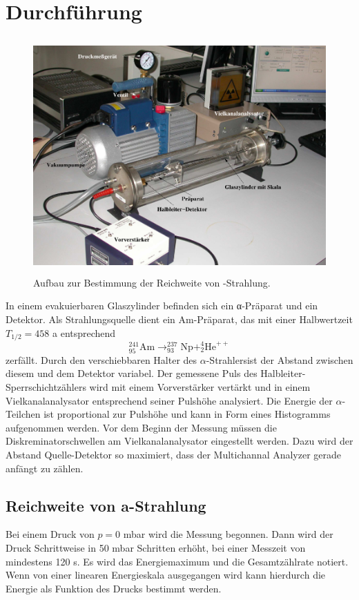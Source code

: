 \section{Durchführung}
\label{sec:Durchführung}

\begin{figure}
  \centering
  \includegraphics[height=9cm]{data/abb1.png}
  \caption{Aufbau zur Bestimmung der Reichweite von \alpha-Strahlung. \cite{sample}}
  \label{fig:abbA1}
\end{figure}
\FloatBarrier

In einem evakuierbaren Glaszylinder befinden sich ein α-Präparat und ein Detektor.
Als Strahlungsquelle dient ein Am-Präparat, das mit einer Halbwertzeit $T_{1/2} = 458$ a entsprechend
\begin{equation}
    _{95}^{241}\text{Am} \longrightarrow _{93}^{237}\text{Np} + _{2}^{4}\text{He}^{++}
    \label{eqn:gl4}
\end{equation}
zerfällt.
Durch den verschiebbaren Halter des $\alpha$-Strahlersist der Abstand zwischen diesem und dem Detektor variabel.
Der gemessene Puls des Halbleiter-Sperrschichtzählers wird mit einem Vorverstärker vertärkt und in einem Vielkanalanalysator entsprechend seiner Pulshöhe analysiert.
Die Energie der $\alpha$-Teilchen ist proportional zur Pulshöhe und kann in Form eines Histogramms aufgenommen werden.
Vor dem Beginn der Messung müssen  die Diskreminatorschwellen am Vielkanalanalysator eingestellt werden.
Dazu wird der Abstand Quelle-Detektor so maximiert, dass der Multichannal Analyzer gerade anfängt zu zählen.

\subsection{Reichweite von a-Strahlung}
Bei einem Druck von $p = 0$ mbar wird die Messung begonnen.
Dann wird der Druck Schrittweise in 50 mbar Schritten erhöht, bei einer Messzeit von mindestens 120 s.
Es wird das Energiemaximum und die Gesamtzählrate notiert.
Wenn von einer linearen Energieskala ausgegangen wird kann hierdurch die Energie als Funktion des Drucks bestimmt werden.

